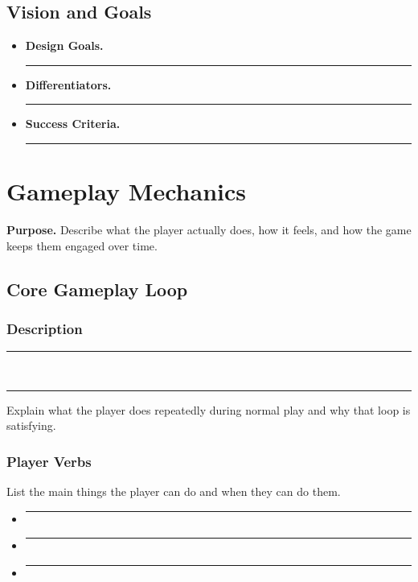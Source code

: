\documentclass[12pt]{article}
\newcommand{\placeholder}[1]{\rule[-0.4em]{0pt}{2em}\rule{0.62\linewidth}{0.4pt}}
\begin{document}
\subsection{Vision and Goals}

\begin{itemize}
    \item \textbf{Design Goals.} \placeholder{Key design goals for the player experience.}
    \item \textbf{Differentiators.} \placeholder{What makes this game stand out from similar titles?}
    \item \textbf{Success Criteria.} \placeholder{How you will know the game has succeeded (qualitative and quantitative).}
\end{itemize}

\section{Gameplay Mechanics}

\textbf{Purpose.} Describe what the player actually does, how it feels, and how the game keeps
them engaged over time.

\subsection{Core Gameplay Loop}

\subsubsection*{Description}

\placeholder{Describe the primary loop.} \\
\rule{0.75\linewidth}{0.4pt}

Explain what the player does repeatedly during normal play and why that loop is satisfying.

\subsubsection*{Player Verbs}

List the main things the player can do and when they can do them.

\begin{itemize}
    \item \placeholder{Movement actions (walk, run, jump, dash, etc.)}
    \item \placeholder{Combat / interaction actions (attack, block, shoot, talk, interact, etc.)}
    \item \placeholder{Puzzle / system interactions (inspect, combine, operate, etc.)}
\end{itemize}
\end{document}
